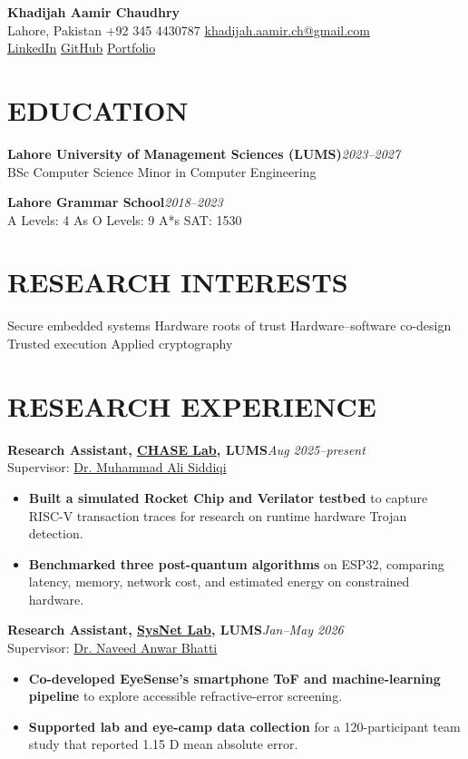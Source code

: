 \documentclass[10pt]{article}
\newcommand{\entry}[3]{\textbf{#1}\hfill {\small\itshape #2}\\[-1pt]{#3}\par}
\newcommand{\link}[2]{\href{#1}{#2}}
\begin{document}
\begin{center}
{\LARGE\textbf{Khadijah Aamir Chaudhry}}\\[2pt]
Lahore, Pakistan \textperiodcentered{} +92 345 4430787 \textperiodcentered{} \href{mailto:khadijah.aamir.ch@gmail.com}{khadijah.aamir.ch@gmail.com}\\
\href{https://www.linkedin.com/in/khadijah-aamir-chaudhry-b88793333/}{LinkedIn} \textperiodcentered{} \href{https://github.com/KAC224}{GitHub} \textperiodcentered{} \href{https://kac224.github.io/}{Portfolio}
\end{center}
\vspace{-7pt}
\section*{EDUCATION}
\entry{Lahore University of Management Sciences (LUMS)}{2023--2027}{BSc Computer Science \textperiodcentered{} Minor in Computer Engineering}
\entry{Lahore Grammar School}{2018--2023}{A Levels: 4 As \textperiodcentered{} O Levels: 9 A*s \textperiodcentered{} SAT: 1530}
\section*{RESEARCH INTERESTS}
Secure embedded systems \textperiodcentered{} Hardware roots of trust \textperiodcentered{} Hardware--software co-design \textperiodcentered{} Trusted execution \textperiodcentered{} Applied cryptography
\section*{RESEARCH EXPERIENCE}
\entry{Research Assistant, \link{https://chase.lums.edu.pk/}{CHASE Lab}, LUMS}{Aug 2025--present}{Supervisor: \link{https://sbasse.lums.edu.pk/lums_employee/9462}{Dr. Muhammad Ali Siddiqi}}
\begin{itemize}
\item \textbf{Built a simulated Rocket Chip and Verilator testbed} to capture RISC-V transaction traces for research on runtime hardware Trojan detection.
\item \textbf{Benchmarked three post-quantum algorithms} on ESP32, comparing latency, memory, network cost, and estimated energy on constrained hardware.
\end{itemize}
\entry{Research Assistant, \link{https://sysnet.lums.edu.pk/}{SysNet Lab}, LUMS}{Jan--May 2026}{Supervisor: \link{https://sbasse.lums.edu.pk/lums_employee/9361}{Dr. Naveed Anwar Bhatti}}
\begin{itemize}
\item \textbf{Co-developed EyeSense's smartphone ToF and machine-learning pipeline} to explore accessible refractive-error screening.
\item \textbf{Supported lab and eye-camp data collection} for a 120-participant team study that reported 1.15 D mean absolute error.
\end{itemize}
\end{document}
